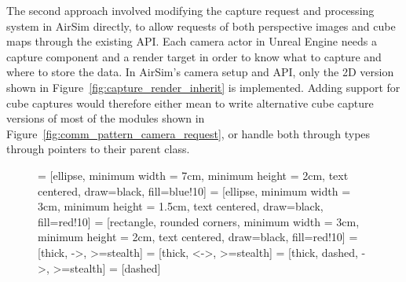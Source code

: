 The second approach involved modifying the capture request and processing system in AirSim directly, to allow requests of both perspective images and cube maps through the existing API. Each camera actor in Unreal Engine needs a capture component and a render target in order to know what to capture and where to store the data. In AirSim's camera setup and API, only the 2D version shown in Figure~\ref{fig:capture_render_inherit} is implemented. Adding support for cube captures would therefore either mean to write alternative cube capture versions of most of the modules shown in Figure~\ref{fig:comm_pattern_camera_request}, or handle both through types through pointers to their parent class.

\begin{figure}[!htb]
    \centering
     = [ellipse, minimum width = 7cm, minimum height = 2cm, text centered, draw=black, fill=blue!10]
     = [ellipse, minimum width = 3cm, minimum height = 1.5cm, text centered, draw=black, fill=red!10]
     = [rectangle, rounded corners, minimum width = 3cm, minimum height = 2cm, text centered, draw=black, fill=red!10]
     = [thick, ->, >=stealth]
     = [thick, <->, >=stealth]
     = [thick, dashed, ->, >=stealth]
     = [dashed]
    
    \newcommand{\drawdashedarrow}{\raisebox{2pt}
    {\tikz{\draw[dashedarrow](0mm,0mm)--(4.25mm,0mm);}}}
    \newcommand{\drawarrow}{\raisebox{2pt}
    {\tikz{
        \draw[singlearrow](0mm,0mm)--(4.25mm,0mm);
        \draw[doublearrow](5mm,0mm)--(9.25mm,0mm);}}}
    \newcommand{\drawopacitydarrow}{\raisebox{2pt}
    {\tikz{
        \draw[singlearrow, opacity=0.5](0mm,0mm)--(4.25mm,0mm);
        \draw[doublearrow, opacity=0.5](5mm,0mm)--(9.25mm,0mm);}}}
    
\end{figure}
